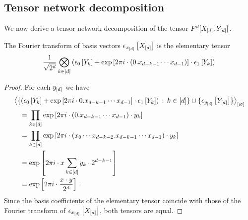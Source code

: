 \subsection{Tensor network decomposition}

We now derive a tensor network decomposition of the tensor $F^{d}[X_{[d]},Y_{[d]}]$.


\begin{lemma}
    The Fourier transform of basis vectors $\epsilon_{x_{[d]}}\left[X_{[d]}\right]$ is the elementary tensor
    \begin{align*}
        \frac{1}{\sqrt{2^{d}}} \bigotimes_{k\in[d]} \left( \epsilon_{0}\left[Y_{k}\right] + \mathrm{exp}\left[2\pi i \cdot (0.x_{d-k-1}\cdots x_{d-1})\right]\cdot \epsilon_{1}\left[Y_{k}\right]\right)
    \end{align*}
\end{lemma}
\begin{proof}
    For each $y_{[d]}$ we have
    \begin{align*}
        &\left\langle 
            \{ \left( \epsilon_{0}\left[Y_{k}\right] + \mathrm{exp}\left[2\pi i \cdot 0.x_{d-k-1}\cdots x_{d-1}\right]\cdot \epsilon_{1}\left[Y_{k}\right]\right) \,:\, k\in[d]\}
            \cup \{\epsilon_{y_{[d]}}\left[Y_{[d]}\right]\}
        \right\rangle_{\left[ \varnothing \right]} \\
        &\quad= \prod_{k\in[d]} \mathrm{exp}\left[2\pi i \cdot (0.x_{d-k-1}\cdots x_{d-1}) \cdot y_{k}\right] \\
        &\quad= \prod_{k\in[d]} \mathrm{exp}\left[2\pi i \cdot (x_{0}\cdots x_{d-k-2}.x_{d-k-1}\cdots x_{d-1}) \cdot y_{k}\right] \\
        &\quad= \mathrm{exp}\left[2\pi i \cdot x \sum_{k\in[d]} y_{k} \cdot 2^{d-k-1}\right] \\
        &\quad= \mathrm{exp}\left[2\pi i \cdot  \frac{x\cdot y}{2^{d}}\right] \, .
    \end{align*}
    Since the basis coefficients of the elementary tensor coincide with those of the Fourier transform of $\epsilon_{x_{[d]}}\left[X_{[d]}\right]$, both tensors are equal.
\end{proof}


